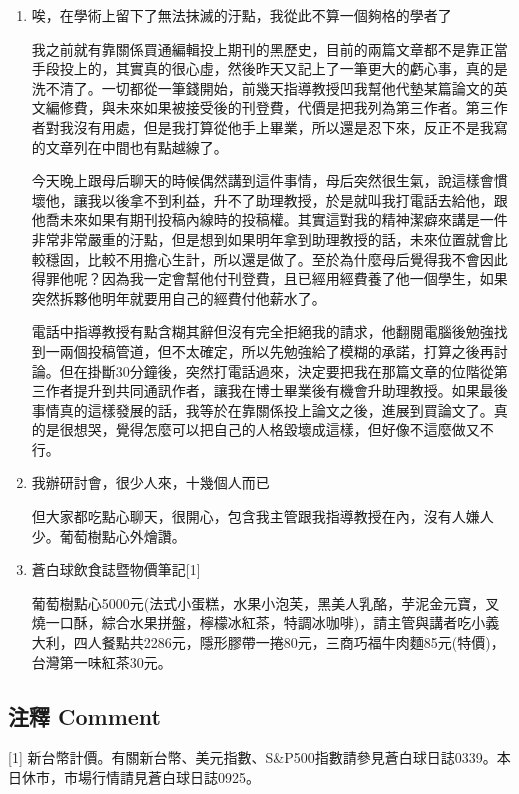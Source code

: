\documentclass[
]{article}
\begin{document}
\begin{enumerate}
\def\labelenumi{\arabic{enumi}.}
\item
  唉，在學術上留下了無法抹滅的汙點，我從此不算一個夠格的學者了

  我之前就有靠關係買通編輯投上期刊的黑歷史，目前的兩篇文章都不是靠正當手段投上的，其實真的很心虛，然後昨天又記上了一筆更大的虧心事，真的是洗不清了。一切都從一筆錢開始，前幾天指導教授凹我幫他代墊某篇論文的英文編修費，與未來如果被接受後的刊登費，代價是把我列為第三作者。第三作者對我沒有用處，但是我打算從他手上畢業，所以還是忍下來，反正不是我寫的文章列在中間也有點越線了。

  今天晚上跟母后聊天的時候偶然講到這件事情，母后突然很生氣，說這樣會慣壞他，讓我以後拿不到利益，升不了助理教授，於是就叫我打電話去給他，跟他喬未來如果有期刊投稿內線時的投稿權。其實這對我的精神潔癖來講是一件非常非常嚴重的汙點，但是想到如果明年拿到助理教授的話，未來位置就會比較穩固，比較不用擔心生計，所以還是做了。至於為什麼母后覺得我不會因此得罪他呢？因為我一定會幫他付刊登費，且已經用經費養了他一個學生，如果突然拆夥他明年就要用自己的經費付他薪水了。

  電話中指導教授有點含糊其辭但沒有完全拒絕我的請求，他翻閱電腦後勉強找到一兩個投稿管道，但不太確定，所以先勉強給了模糊的承諾，打算之後再討論。但在掛斷30分鐘後，突然打電話過來，決定要把我在那篇文章的位階從第三作者提升到共同通訊作者，讓我在博士畢業後有機會升助理教授。如果最後事情真的這樣發展的話，我等於在靠關係投上論文之後，進展到買論文了。真的是很想哭，覺得怎麼可以把自己的人格毀壞成這樣，但好像不這麼做又不行。
\item
  我辦研討會，很少人來，十幾個人而已

  但大家都吃點心聊天，很開心，包含我主管跟我指導教授在內，沒有人嫌人少。葡萄樹點心外燴讚。
\item
  蒼白球飲食誌暨物價筆記{[}1{]}

  葡萄樹點心5000元(法式小蛋糕，水果小泡芙，黑美人乳酪，芋泥金元寶，叉燒一口酥，綜合水果拼盤，檸檬冰紅茶，特調冰咖啡)，請主管與講者吃小義大利，四人餐點共2286元，隱形膠帶一捲80元，三商巧福牛肉麵85元(特價)，台灣第一味紅茶30元。
\end{enumerate}

\hypertarget{ux6ce8ux91cb-comment-25}{%
\subsection{注釋 Comment}\label{ux6ce8ux91cb-comment-25}}

{[}1{]}
新台幣計價。有關新台幣、美元指數、S\&P500指數請參見蒼白球日誌0339。本日休市，市場行情請見蒼白球日誌0925。
\end{document}
